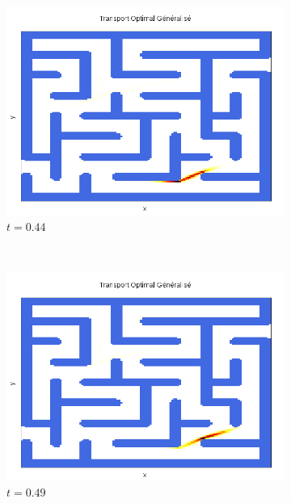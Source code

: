 \documentclass[a4paper,12pt]{article}
\begin{document}
\begin{figure}[!h]
\begin{subfigure}[b]{0.23\linewidth}
\includegraphics[width=\linewidth]{img/2DLabyrinthe/T_00045.png}
\caption*{$t=0.44$}
\end{subfigure}
~
\begin{subfigure}[b]{0.23\linewidth}
\includegraphics[width=\linewidth]{img/2DLabyrinthe/T_00050.png}
\caption*{$t=0.49$}
\end{subfigure}
~
\begin{subfigure}[b]{0.23\linewidth}

\end{subfigure}
\end{figure}
\end{document}

